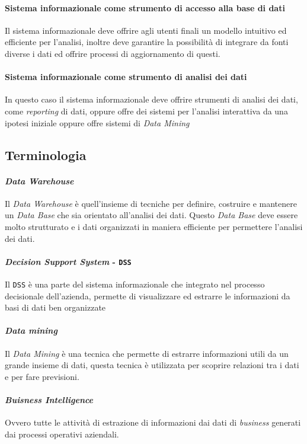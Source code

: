         \paragraph{Sistema informazionale come strumento di accesso alla base di dati} Il sistema informazionale deve offrire agli utenti finali un modello intuitivo ed efficiente per l'analisi, inoltre deve garantire la possibilità di integrare da fonti diverse i dati ed offrire processi di aggiornamento di questi.
        \paragraph{Sistema informazionale come strumento di analisi dei dati} In questo caso il sistema informazionale deve offrire strumenti di analisi dei dati, come \textit{reporting} di dati, oppure offre dei sistemi per l'analisi interattiva da una ipotesi iniziale oppure offre sistemi di \textit{Data Mining}
    \subsection{Terminologia}
        \paragraph{\textit{Data Warehouse}} Il \textit{Data Warehouse} è quell'insieme di tecniche per definire, costruire e mantenere un \textit{Data Base} che sia orientato all'analisi dei dati. Questo \textit{Data Base} deve essere molto strutturato e i dati organizzati in maniera efficiente per permettere l'analisi dei dati.
        \paragraph{\textit{Decision Support System} - \texttt{DSS}} Il \texttt{DSS} è una parte del sistema informazionale che integrato nel processo decisionale dell'azienda, permette di visualizzare ed estrarre le informazioni da basi di dati ben organizzate
        \paragraph{\textit{Data mining}} Il \textit{Data Mining} è una tecnica che permette di estrarre informazioni utili da un grande insieme di dati, questa tecnica è utilizzata per scoprire relazioni tra i dati e per fare previsioni.
        \paragraph{\textit{Buisness Intelligence}} Ovvero tutte le attività di estrazione di informazioni dai dati di \textit{business} generati dai processi operativi aziendali.
